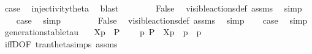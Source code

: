 \begin{isabellebody}
\ {\isacharquery}{\kern0pt}case\ \isamarkupfalse%
\ injectivity{\isacharunderscore}{\kern0pt}theta{\isacharparenleft}{\kern0pt}{}{\isacharparenright}{\kern0pt}\ \isamarkupfalse%
\ blast\isanewline
{}\isamarkupfalse%
\isanewline
\ \ \isamarkupfalse%
\ {}\isanewline
\ \ \isamarkupfalse%
\ False\ \isamarkupfalse%
\ visible{\isacharunderscore}{\kern0pt}actions{\isacharunderscore}{\kern0pt}def\ assms{\isacharparenleft}{\kern0pt}{}{\isacharparenright}{\kern0pt}\ \isamarkupfalse%
\ simp\isanewline
\ \ \isamarkupfalse%
\ {\isacharquery}{\kern0pt}case\ \isamarkupfalse%
\ simp\isanewline
{}\isamarkupfalse%
\isanewline
\ \ \isamarkupfalse%
\ {}\isanewline
\ \ \isamarkupfalse%
\ False\ \isamarkupfalse%
\ visible{\isacharunderscore}{\kern0pt}actions{\isacharunderscore}{\kern0pt}def\ assms{\isacharparenleft}{\kern0pt}{}{\isacharparenright}{\kern0pt}\ \isamarkupfalse%
\ simp\isanewline
\ \ \isamarkupfalse%
\ {\isacharquery}{\kern0pt}case\ \isamarkupfalse%
\ simp\isanewline
{}\isamarkupfalse%
%
\endisatagproof
{\isafoldproof}%
%
\isadelimproof
\isanewline
%
\endisadelimproof
\isanewline
{}\isamarkupfalse%
\ generation{\isacharunderscore}{\kern0pt}stable{\isacharunderscore}{\kern0pt}tau{\isacharcolon}{\kern0pt}\isanewline
\ \ \ {\isacartoucheopen}{\isasymtheta}{\isacharbrackleft}{\kern0pt}X{\isacharbrackright}{\kern0pt}{\isacharparenleft}{\kern0pt}p{\isacharparenright}{\kern0pt}\ {\isasymlongmapsto}\isactrlsup {\isasymtheta}{\isasymtau}\ P{\isacharprime}{\kern0pt}{\isacartoucheclose}\isanewline
\ \ \ {\isacartoucheopen}{\isasymexists}\ p{\isacharprime}{\kern0pt}{\isachardot}{\kern0pt}\ P{\isacharprime}{\kern0pt}\ {\isacharequal}{\kern0pt}\ {\isasymtheta}{\isacharbrackleft}{\kern0pt}X{\isacharbrackright}{\kern0pt}{\isacharparenleft}{\kern0pt}p{\isacharprime}{\kern0pt}{\isacharparenright}{\kern0pt}\ {\isasymand}\ p\ {\isasymlongmapsto}{\isasymtau}\ p{\isacharprime}{\kern0pt}{\isacartoucheclose}\isanewline
%
\isadelimproof
\ \ %
\endisadelimproof
%
\isatagproof
{}\isamarkupfalse%
\ iffD{}{\isacharbrackleft}{\kern0pt}OF\ tran{\isacharunderscore}{\kern0pt}theta{\isachardot}{\kern0pt}simps\ assms{\isacharbrackright}{\kern0pt}\isanewline
{}\isamarkupfalse%

\end{isabellebody}
